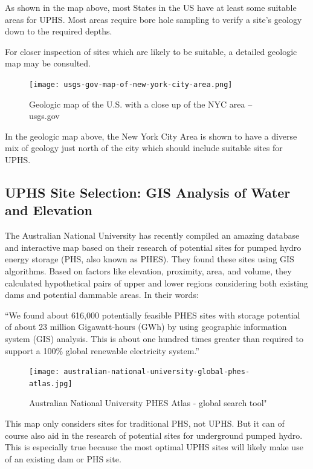 \documentclass[hidelinks,12pt,a4paper]{article}
\begin{document}
As shown in the map above, most States in the US have at least some suitable areas for UPHS. Most areas require bore hole sampling to verify a site's geology down to the required depths.

For closer inspection of sites which are likely to be suitable, a detailed geologic map may be consulted.

\begin{figure}[ht!]
    \centering
    \texttt{[image: usgs-gov-map-of-new-york-city-area.png]}
    \caption{Geologic map of the U.S. with a close up of the NYC area -- usgs.gov \cite{MineralResourcesOnlineSpatialDataGeologicmaps}}
\end{figure}
\FloatBarrier

In the geologic map above, the New York City Area is shown to have a diverse mix of geology just north of the city which should include suitable sites for UPHS.

\subsection{UPHS Site Selection: GIS Analysis of Water and Elevation}
The Australian National University has recently compiled an amazing database and interactive map based on their research of potential sites for pumped hydro energy storage (PHS, also known as PHES). They found these sites using GIS algorithms. Based on factors like elevation, proximity, area, and volume, they calculated hypothetical pairs of upper and lower regions considering both existing dams and potential dammable areas. In their words:

\begin{displayquote}
“We found about 616,000 potentially feasible PHES sites with storage potential of about 23 million Gigawatt-hours (GWh) by using geographic information system (GIS) analysis. This is about one hundred times greater than required to support a 100\% global renewable electricity system.”
\end{displayquote}

\begin{figure}[ht!]
    \centering
    \texttt{[image: australian-national-university-global-phes-atlas.jpg]}
    \caption{Australian National University PHES Atlas - global search tool" \cite{AustralianNationalUniversityGlobalPHESAtlas}}
\end{figure}
\FloatBarrier

This map only considers sites for traditional PHS, not UPHS. But it can of course also aid in the research of potential sites for underground pumped hydro. This is especially true because the most optimal UPHS sites will likely make use of an existing dam or PHS site.
\end{document}

